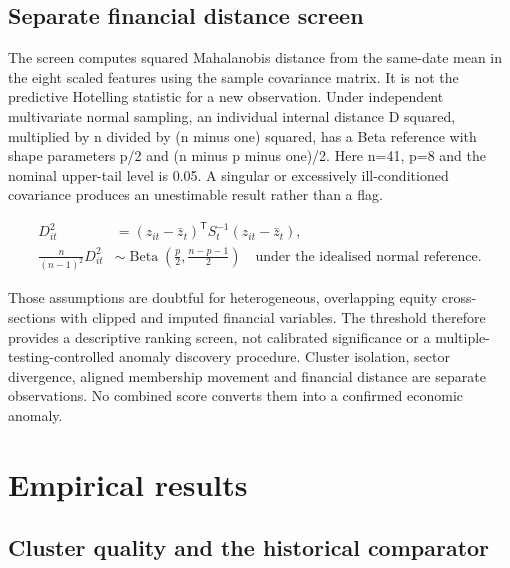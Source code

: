 \subsection{Separate financial distance screen}

The screen computes squared Mahalanobis distance from the same-date mean in the eight scaled features using the sample covariance matrix. It is not the predictive Hotelling statistic for a new observation. Under independent multivariate normal sampling, an individual internal distance D squared, multiplied by n divided by (n minus one) squared, has a Beta reference with shape parameters p/2 and (n minus p minus one)/2. Here n=41, p=8 and the nominal upper-tail level is 0.05. A singular or excessively ill-conditioned covariance produces an unestimable result rather than a flag.


\begin{align}
D_{it}^2&=(z_{it}-\bar z_t)^{\mathsf T}S_t^{-1}(z_{it}-\bar z_t),\\
\frac{n}{(n-1)^2}D_{it}^2&\sim\operatorname{Beta}\!\left(\frac p2,\frac{n-p-1}{2}\right)
\quad\text{under the idealised normal reference}.
\label{eq:distance}\end{align}

Those assumptions are doubtful for heterogeneous, overlapping equity cross-sections with clipped and imputed financial variables. The threshold therefore provides a descriptive ranking screen, not calibrated significance or a multiple-testing-controlled anomaly discovery procedure. Cluster isolation, sector divergence, aligned membership movement and financial distance are separate observations. No combined score converts them into a confirmed economic anomaly.


\FloatBarrier
\section{Empirical results}

\subsection{Cluster quality and the historical comparator}


